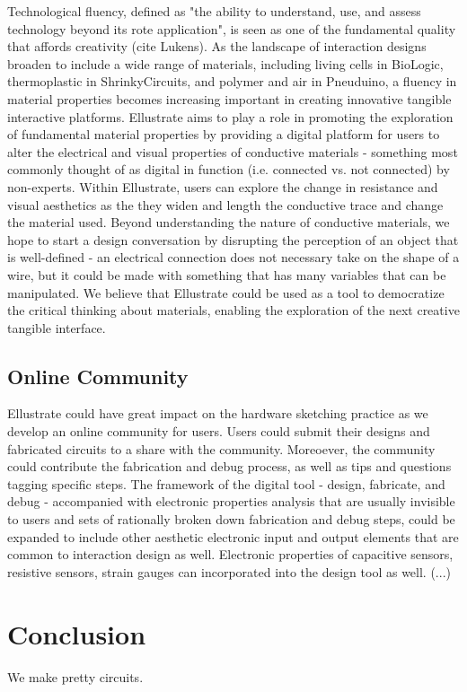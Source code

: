 \documentclass{sigchi}
\begin{document}
Technological fluency, defined as "the ability to understand, use, and assess technology beyond its rote application", is seen as one of the fundamental quality that affords creativity (cite Lukens). As the landscape of interaction designs broaden to include a wide range of materials, including living cells in BioLogic, thermoplastic in ShrinkyCircuits, and polymer and air in Pneuduino, a fluency in material properties becomes increasing important in creating innovative tangible interactive platforms. Ellustrate aims to play a role in promoting the exploration of fundamental material properties by providing a digital platform for users to alter the electrical and visual properties of conductive materials - something most commonly thought of as digital in function (i.e. connected vs. not connected) by non-experts. Within Ellustrate, users can explore the change in resistance and visual aesthetics as the they widen and length the conductive trace and change the material used. Beyond understanding the nature of conductive materials, we hope to start a design conversation by disrupting the perception of an object that is well-defined - an electrical connection does not necessary take on the shape of a wire, but it could be made with something that has many variables that can be manipulated. We believe that Ellustrate could be used as a tool to democratize the critical thinking about materials, enabling the exploration of the next creative tangible interface. 


\subsection{Online Community}
Ellustrate could have great impact on the hardware sketching practice as we develop an online community for users. Users could submit their designs and fabricated circuits to a share with the community. Moreoever, the community could contribute the fabrication and debug process, as well as tips and questions tagging specific steps. The framework of the digital tool - design, fabricate, and debug - accompanied with electronic properties analysis that are usually invisible to users and sets of rationally broken down fabrication and debug steps, could be expanded to include other aesthetic electronic input and output elements that are common to interaction design as well. Electronic properties of capacitive sensors, resistive sensors, strain gauges can incorporated into the design tool as well. (...)

\section {Conclusion}
We make pretty circuits.


\balance



\end{document}
